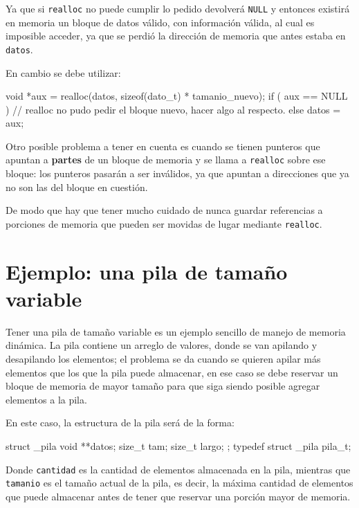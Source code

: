 Ya que si \lstinline!realloc! no puede cumplir lo pedido devolverá
\lstinline!NULL! y entonces existirá en memoria un bloque de datos válido, con
información válida, al cual es imposible acceder, ya que se perdió la
dirección de memoria que antes estaba en \lstinline!datos!.

En cambio se debe utilizar:

\begin{codigo-c-plano}
void *aux = realloc(datos, sizeof(dato_t) * tamanio_nuevo);
if ( aux == NULL ) {
    // realloc no pudo pedir el bloque nuevo, hacer algo al respecto.
} else {
    datos = aux;
}
\end{codigo-c-plano}

Otro posible problema a tener en cuenta es cuando se tienen punteros que
apuntan a \textbf{partes} de un bloque de memoria y se llama a
\lstinline!realloc! sobre ese bloque: los punteros pasarán a ser inválidos, ya
que apuntan a direcciones que ya no son las del bloque en cuestión.

De modo que hay que tener mucho cuidado de nunca guardar referencias a
porciones de memoria que pueden ser movidas de lugar mediante
\lstinline!realloc!.

\section{Ejemplo: una pila de tamaño variable}

Tener una pila de tamaño variable es un ejemplo sencillo de manejo de memoria
dinámica. La pila contiene un arreglo de valores, donde se van apilando y
desapilando los elementos; el problema se da cuando se quieren apilar más
elementos que los que la pila puede almacenar, en ese caso se debe reservar un
bloque de memoria de mayor tamaño para que siga siendo posible agregar
elementos a la pila.

En este caso, la estructura de la pila será de la forma:

\begin{codigo-c-plano}
struct _pila {
    void **datos;
    size_t tam;
    size_t largo;
};
typedef struct _pila pila_t;
\end{codigo-c-plano}

Donde \lstinline!cantidad! es la cantidad de elementos almacenada en la pila,
mientras que \lstinline!tamanio! es el tamaño actual de la pila, es decir, la
máxima cantidad de elementos que puede almacenar antes de tener que reservar
una porción mayor de memoria.

